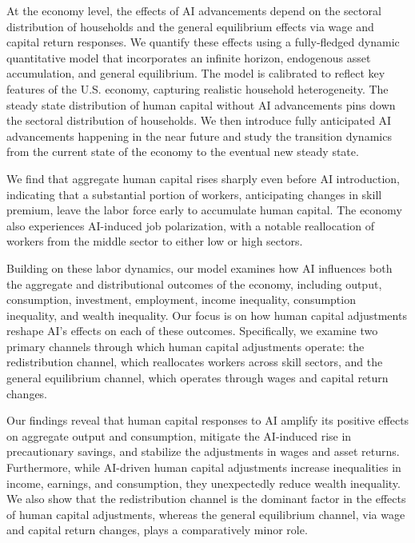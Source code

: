 \documentclass[12pt]{article}
\begin{document}
At the economy level, the effects of AI advancements depend on the sectoral distribution of households and the general equilibrium effects via wage and capital return responses. We quantify these effects using a fully-fledged dynamic quantitative model that incorporates an infinite horizon, endogenous asset accumulation, and general equilibrium. The model is calibrated to reflect key features of the U.S. economy, capturing
realistic household heterogeneity. The steady state distribution of human capital without AI advancements pins down the sectoral distribution of households. We then introduce fully anticipated AI advancements happening in the near future and study the transition dynamics from the current state of the economy to the eventual new steady state. 

We find that aggregate human capital rises sharply even before AI introduction, indicating that a substantial portion of workers, anticipating changes in skill premium, leave the labor force early to accumulate human capital. The economy also experiences AI-induced job polarization, with a notable reallocation of workers from the middle sector to either low or high sectors.

Building on these labor dynamics, our model examines how AI influences both the aggregate and distributional outcomes of the economy, including output, consumption, investment, employment, income inequality, consumption inequality, and wealth inequality. Our focus is on how human capital adjustments reshape AI’s effects on each of these outcomes. Specifically, we examine two primary channels through which human capital adjustments operate: the redistribution channel, which reallocates workers across skill sectors, and the general equilibrium channel, which operates through wages and capital return changes.

Our findings reveal that human capital responses to AI amplify its positive effects on aggregate output and consumption, mitigate the AI-induced rise in precautionary savings, and stabilize the adjustments in wages and asset returns. Furthermore, while AI-driven human capital adjustments increase inequalities in income, earnings, and consumption, they unexpectedly reduce wealth inequality. We also show that the redistribution channel is the dominant factor in the effects of human capital adjustments, whereas the general equilibrium channel, via wage and capital return changes, plays a comparatively minor role.

\end{document}
